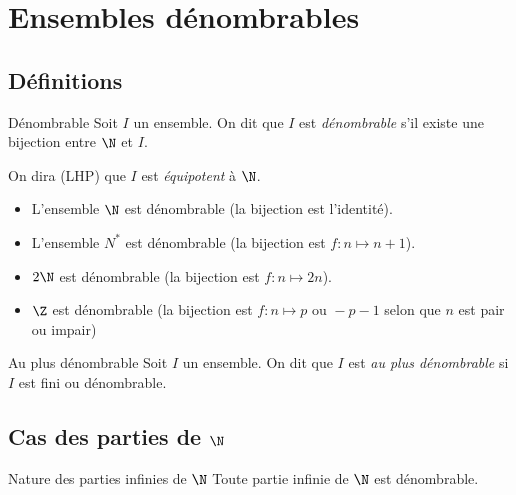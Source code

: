 
\section{Ensembles dénombrables}
\subsection{Définitions }

\begin{definition}{Dénombrable}{}
    Soit $I$ un ensemble. On dit que $I$ est \emph{dénombrable} 
    s'il existe une bijection entre $\N$ et $I$. 

    On dira (LHP) que $I$ est \emph{équipotent} à $\N$.
\end{definition}

\begin{exemple}
    \begin{itemize}
        \item L'ensemble $\N$ est dénombrable (la bijection est l'identité).
        \item L'ensemble $N^*$ est dénombrable (la bijection est $f : n \mapsto n+1$).
        \item $2 \N$ est dénombrable (la bijection est $f : n \mapsto 2n$).
        \item $\Z$ est dénombrable (la bijection est $f : n \mapsto p \text{ ou } -p-1$ selon que $n$ est pair ou impair)
    \end{itemize}
\end{exemple}


\begin{definition}{Au plus dénombrable}{}
    Soit $I$ un ensemble. On dit que $I$ est \emph{au plus dénombrable} si $I$ est 
    fini ou dénombrable.
\end{definition}

\subsection{Cas des parties de \texorpdfstring{$\N$}{N}}

\begin{theoreme}{Nature des parties infinies de $\N$}{}
    Toute partie infinie de $\N$ est dénombrable.
\end{theoreme}


